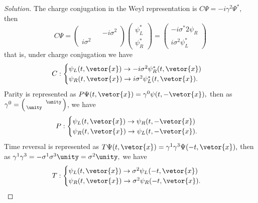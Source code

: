 \begin{proof}[Solution]
   The charge conjugation in the Weyl representation is \(C\Psi = -i \gamma^2\Psi^*,\) then
   \begin{equation*}
      C\Psi = \begin{pmatrix}
          && -i \sigma^2\\
         i\sigma^2 && 
      \end{pmatrix}
      \begin{pmatrix}
         \psi_L^*\\
         \psi_R^*
         \end{pmatrix} = \begin{pmatrix}
         -i\sigma^*2 \psi_R\\
         i \sigma^2 \psi_L^*
      \end{pmatrix}
   \end{equation*}
   that is, under charge conjugation we have
   \begin{equation*}
       C : \begin{cases}
          \psi_L(t, \vetor{x}) \to -i \sigma^2 \psi_R^* (t, \vetor{x})\\
          \psi_R(t, \vetor{x}) \to i \sigma^2 \psi_L^* (t, \vetor{x}).
       \end{cases}
   \end{equation*}
   Parity is represented as \(P \Psi(t, \vetor{x}) = \gamma^0 \psi(t, - \vetor{x}),\) then as \(\gamma^0 = \left(\begin{smallmatrix} &&\unity\\\unity&& \end{smallmatrix}\right)\), we have
   \begin{equation*}
       P : \begin{cases}
          \psi_L(t, \vetor{x}) \to \psi_R(t, -\vetor{x})\\
          \psi_R(t, \vetor{x}) \to \psi_L(t, -\vetor{x}).
       \end{cases}
   \end{equation*}
   Time reversal is represented as \(T\Psi(t, \vetor{x}) = \gamma^1 \gamma^3 \Psi(-t, \vetor{x}),\) then as \(\gamma^1 \gamma^3 = -\sigma^1\sigma^3\unity = \sigma^2 \unity,\) we have
   \begin{equation*}
       T : \begin{cases}
          \psi_L(t, \vetor{x}) \to \sigma^2\psi_L(-t, \vetor{x})\\
          \psi_R(t, \vetor{x}) \to \sigma^2\psi_R(-t, \vetor{x}).
       \end{cases}
   \end{equation*}


\end{proof}
